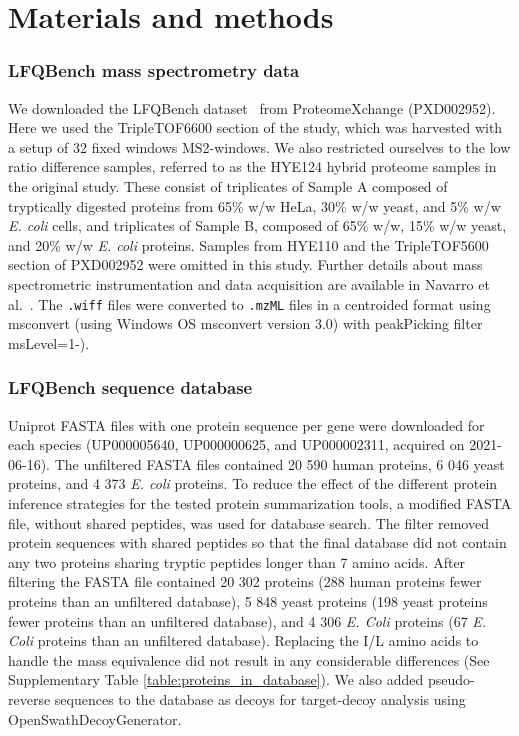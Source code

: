 \documentclass[10pt,letterpaper]{article}
\begin{document}
\section*{Materials and methods}


\subsubsection*{LFQBench mass spectrometry data}

We downloaded the LFQBench dataset~\cite{navarro2016multicenter} from ProteomeXchange (PXD002952). Here we used the TripleTOF6600 section of the study, which was harvested with a setup of 32 fixed windows MS2-windows. We also restricted ourselves to the low ratio difference samples, referred to as the HYE124 hybrid proteome samples in the original study. These consist of triplicates of Sample A composed of tryptically digested proteins from 65\% w/w HeLa, 30\% w/w yeast, and 5\% w/w \textit{E. coli} cells, and triplicates of Sample B, composed of 65\% w/w, 15\% w/w yeast, and 20\% w/w \textit{E. coli} proteins. Samples from HYE110 and the TripleTOF5600 section of PXD002952 were omitted in this study. Further details about mass spectrometric instrumentation and data acquisition are available in Navarro et al.~\cite{navarro2016multicenter}. The \verb|.wiff| files were converted to \verb|.mzML| files in a centroided format using msconvert (using Windows OS msconvert version 3.0) with peakPicking filter msLevel=1-). 

\subsubsection*{LFQBench sequence database}

Uniprot FASTA files with one protein sequence per gene were downloaded for each species (UP000005640, UP000000625, and UP000002311, acquired on 2021-06-16). The unfiltered FASTA files contained 20 590 human proteins, 6 046 yeast proteins, and 4 373 \textit{E. coli} proteins. To reduce the effect of the different protein inference strategies for the tested protein summarization tools, a modified FASTA file, without shared peptides, was used for database search. The filter removed protein sequences with shared peptides so that the final database did not contain any two proteins sharing tryptic peptides longer than 7 amino acids. After filtering the FASTA file contained 20 302 proteins (288 human proteins fewer proteins than an unfiltered database), 5 848 yeast proteins (198 yeast proteins fewer proteins than an unfiltered database), and 4 306 \textit{E. Coli} proteins (67 \textit{E. Coli} proteins than an unfiltered database). Replacing the I/L amino acids to handle the mass equivalence did not result in any considerable differences (See Supplementary Table \ref{table:proteins_in_database}). We also added pseudo-reverse sequences to the database as decoys for target-decoy analysis using OpenSwathDecoyGenerator. 
\end{document}

